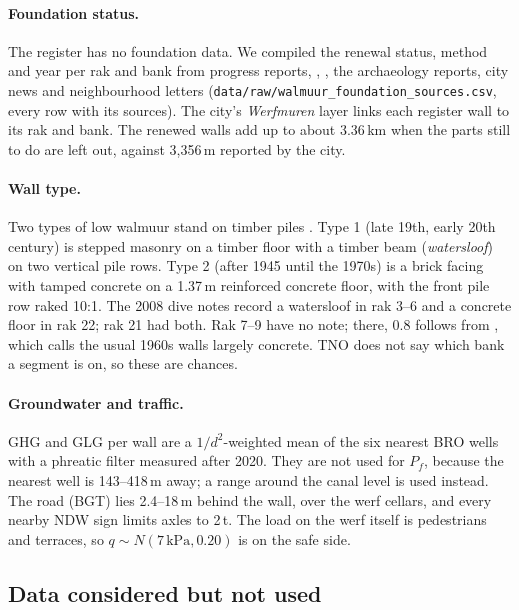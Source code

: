 \paragraph{Foundation status.} The register has no foundation data. We
compiled the renewal status, method and year per rak and bank from progress
reports, \cite{antea2019}, \cite{gu2025up}, the archaeology reports, city news
and neighbourhood letters (\texttt{data/raw/walmuur\_foundation\_sources.csv},
every row with its sources). The city's \emph{Werfmuren} layer links each
register wall to its rak and bank. The renewed walls add up to about 3.36\,km
when the parts still to do are left out, against 3{,}356\,m reported by the
city.

\paragraph{Wall type.} Two types of low walmuur stand on timber piles
\cite{ibu2010}. Type 1 (late 19th, early 20th century) is stepped masonry on a
timber floor with a timber beam (\emph{watersloof}) on two vertical pile rows.
Type 2 (after 1945 until the 1970s) is a brick facing with tamped concrete on
a 1.37\,m reinforced concrete floor, with the front pile row raked 10:1. The
2008 dive notes \cite{tno2009} record a watersloof in rak 3--6 and a concrete
floor in rak 22; rak 21 had both. Rak 7--9 have no note; there, 0.8 follows
from \cite{erfgoed156}, which calls the usual 1960s walls largely concrete.
TNO does not say which bank a segment is on, so these are chances.

\paragraph{Groundwater and traffic.} GHG and GLG per wall are a
$1/d^2$-weighted mean of the six nearest BRO wells with a phreatic filter
measured after 2020. They are not used for $P_f$, because the nearest well is
143--418\,m away; a range around the canal level is used instead. The road
(BGT) lies 2.4--18\,m behind the wall, over the werf cellars, and every nearby
NDW sign limits axles to 2\,t. The load on the werf itself is pedestrians and
terraces, so $q \sim N(7\,\text{kPa}, 0.20)$ is on the safe side.

\subsection{Data considered but not used}\label{app:data-unused}

